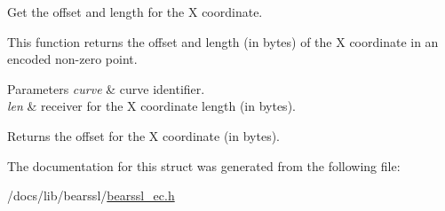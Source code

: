 Get the offset and length for the X coordinate. 

This function returns the offset and length (in bytes) of the X coordinate in an encoded non-\/zero point.


\begin{DoxyParams}{Parameters}
{\em curve} & curve identifier. \\
\hline
{\em len} & receiver for the X coordinate length (in bytes). \\
\hline
\end{DoxyParams}
\begin{DoxyReturn}{Returns}
the offset for the X coordinate (in bytes). 
\end{DoxyReturn}


The documentation for this struct was generated from the following file\+:\begin{DoxyCompactItemize}
\item 
/docs/lib/bearssl/\hyperlink{bearssl__ec_8h}{bearssl\+\_\+ec.\+h}\end{DoxyCompactItemize}
